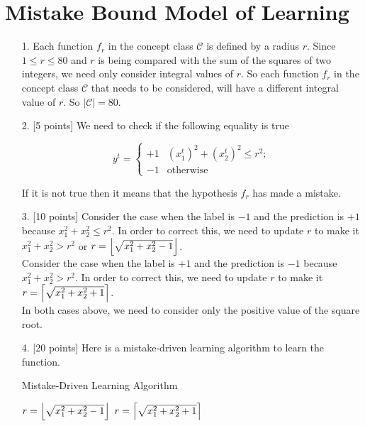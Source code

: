 \section{Mistake Bound Model of Learning}
\begin{enumerate}


\item[1.] Each function $f_r$ in the concept class $\mathcal{C}$ is defined by a radius $r$. Since $1 \leq r \leq 80$ and $r$ is being compared with the sum of the squares of two integers, we need only consider integral values of $r$. So each function  $f_r$ in the concept class $\mathcal{C}$ that needs to be considered, will have a different integral value of $r$. So $|\mathcal{C}| = 80$.
  
\item[2.] [5 points] We need to check if the following equality is true

\begin{equation*}
y^t = \left\{
    \begin{array}{rl}
      +1 & (x_1^t)^2 + (x_2^t)^2 \leq r^2;\\
      -1 & \mbox{otherwise}
    \end{array}
\right.
\label{eq:f_r}
\end{equation*}

If it is not true then it means that the hypothesis $f_r$ has made a mistake.

\item[3.] [10 points] Consider the case when the label is $-1$ and the prediction is $+1$ because $x_1^2 + x_2^2 \leq r^2$. In order to correct this, we need to update $r$ to make it $x_1^2 + x_2^2 > r^2$ or $r = \floor*{\sqrt{x_1^2 + x_2^2 - 1}}$.\\

Consider the case when the label is $+1$ and the prediction is $-1$ because $x_1^2 + x_2^2 > r^2$. In order to correct this, we need to update $r$ to make it $r = \ceil*{\sqrt{x_1^2 + x_2^2 + 1}}$.\\

In both cases above, we need to consider only the positive value of the square root.

\item[4.] [20 points] Here is a mistake-driven learning algorithm to learn the function.

\begin{minipage}{\linewidth}
  \begin{algorithm}[H]
    \caption{Mistake-Driven Learning Algorithm}\label{MDLA}
    \begin{algorithmic}[1]
	    \State $r = \floor*{\sqrt{x_1^2 + x_2^2 - 1}}$
	  \EndIf
	\Else 
	   \State $r = \ceil*{\sqrt{x_1^2 + x_2^2 + 1}}$
	  \EndIf
	\EndIf
      \EndProcedure
    \end{algorithmic}
  \end{algorithm}
\end{minipage}\\


\end{enumerate}
